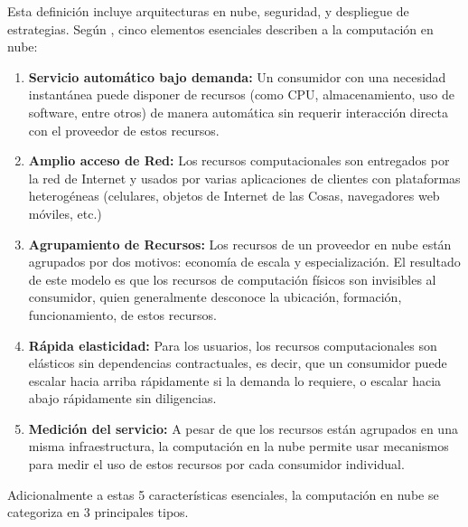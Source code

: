 Esta definición incluye arquitecturas en nube, seguridad, y despliegue de estrategias. Según \cite{dillon2010cloud}, cinco elementos esenciales describen a la computación 
en nube:

\begin{enumerate}
 \item \textbf{Servicio automático bajo demanda:} Un consumidor con una necesidad instantánea puede disponer de recursos (como CPU, almacenamiento, uso 
 de software, entre otros) de manera automática sin requerir interacción directa con el proveedor de estos recursos.
 \item \textbf{Amplio acceso de Red:} Los recursos computacionales son entregados por la red de Internet y usados por varias aplicaciones de 
 clientes con plataformas heterogéneas (celulares, objetos de Internet de las Cosas, navegadores web móviles, etc.)
 \item \textbf{Agrupamiento de Recursos:} Los recursos de un proveedor en nube están agrupados por dos motivos: economía de escala y especialización. El resultado de este modelo
 es que los recursos de computación físicos son invisibles al consumidor, quien generalmente desconoce la ubicación, formación, funcionamiento, 
 de estos recursos.
 \item \textbf{Rápida elasticidad:} Para los usuarios, los recursos computacionales son elásticos sin dependencias contractuales, es decir, que
 un consumidor puede escalar hacia arriba rápidamente si la demanda lo requiere, o escalar hacia  abajo rápidamente sin diligencias.
 \item \textbf{Medición del servicio:} A pesar de que los recursos están agrupados en una misma infraestructura, la computación en la nube permite
 usar mecanismos para medir el uso de estos recursos por cada consumidor individual.
 
\end{enumerate}

Adicionalmente a estas 5 características esenciales, la computación en nube se categoriza en 3 principales tipos. 

